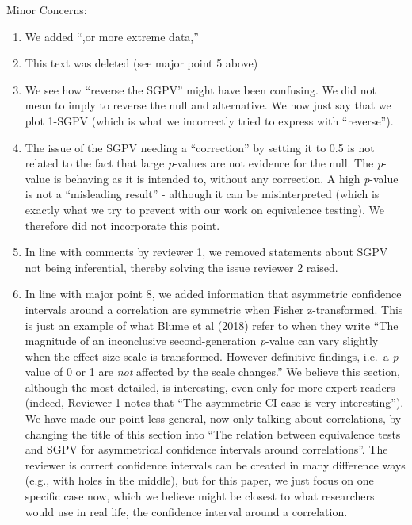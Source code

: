 \documentclass[man]{apa6}
\begin{document}
Minor Concerns:

\begin{enumerate}
\def\labelenumi{\arabic{enumi}.}
\item
  We added \enquote{,or more extreme data,}
\item
  This text was deleted (see major point 5 above)
\item
  We see how \enquote{reverse the SGPV} might have been confusing. We
  did not mean to imply to reverse the null and alternative. We now just
  say that we plot 1-SGPV (which is what we incorrectly tried to express
  with \enquote{reverse}).
\item
  The issue of the SGPV needing a \enquote{correction} by setting it to
  0.5 is not related to the fact that large \emph{p}-values are not
  evidence for the null. The \emph{p}-value is behaving as it is
  intended to, without any correction. A high \emph{p}-value is not a
  \enquote{misleading result} - although it can be misinterpreted (which
  is exactly what we try to prevent with our work on equivalence
  testing). We therefore did not incorporate this point.
\item
  In line with comments by reviewer 1, we removed statements about SGPV
  not being inferential, thereby solving the issue reviewer 2 raised.
\item
  In line with major point 8, we added information that asymmetric
  confidence intervals around a correlation are symmetric when Fisher
  z-transformed. This is just an example of what Blume et al (2018)
  refer to when they write \enquote{The magnitude of an inconclusive
  second-generation \emph{p}-value can vary slightly when the effect
  size scale is transformed. However definitive findings, i.e.~a
  \emph{p}-value of 0 or 1 are \emph{not} affected by the scale
  changes.} We believe this section, although the most detailed, is
  interesting, even only for more expert readers (indeed, Reviewer 1
  notes that \enquote{The asymmetric CI case is very interesting}). We
  have made our point less general, now only talking about correlations,
  by changing the title of this section into \enquote{The relation
  between equivalence tests and SGPV for asymmetrical confidence
  intervals around correlations}. The reviewer is correct confidence
  intervals can be created in many difference ways (e.g., with holes in
  the middle), but for this paper, we just focus on one specific case
  now, which we believe might be closest to what researchers would use
  in real life, the confidence interval around a correlation.

\end{enumerate}
\end{document}
